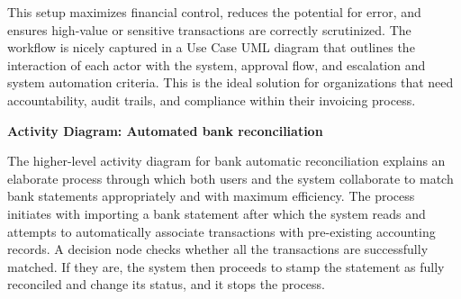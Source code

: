 \documentclass[11pt,a4paper]{article}
\begin{document}
\noindent This setup maximizes financial control, reduces the potential for error, and ensures high-value or 
sensitive transactions are correctly scrutinized. The workflow is nicely captured in a Use Case 
UML diagram that outlines the interaction of each actor with the system, approval flow, and 
escalation and system automation criteria. This is the ideal solution for organizations that need 
accountability, audit trails, and compliance within their invoicing process.
\bigskip

\noindent\textbf{Activity Diagram: Automated bank reconciliation}

\noindent The higher-level activity diagram for bank automatic reconciliation explains an elaborate process 
through which both users and the system collaborate to match bank statements appropriately and 
with maximum efficiency. The process initiates 
with importing a bank statement after which 
the system reads and attempts to automatically 
associate transactions with pre-existing 
accounting records. A decision node checks 
whether all the transactions are successfully 
matched. If they are, the system then proceeds 
to stamp the statement as fully reconciled and 
change its status, and it stops the process.
\end{document}
